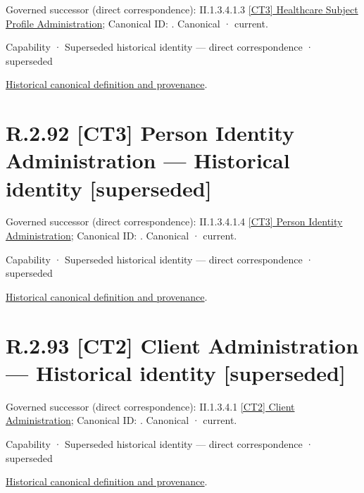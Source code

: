 {\small Governed successor (direct correspondence): II.1.3.4.1.3 \hyperref[element:df214b5499694b768eb4a7a175a9d471]{[CT3] Healthcare Subject Profile Administration}; Canonical ID: \texttt{}. Canonical · current.}\par
\label{element:d653c3247ddd49479f985f6b435933a0}
{\small Capability · Superseded historical identity — direct correspondence · superseded}\par
\href{../../../../../../../continuum/strategy/capability/d653c3247ddd49479f985f6b435933a0.md}{Historical canonical definition and provenance}.\par
\section*{R.2.92 [CT3] Person Identity Administration — Historical identity [superseded]}
\label{navigation:R.2.92}

{\small Governed successor (direct correspondence): II.1.3.4.1.4 \hyperref[element:6c3de7750ef1436cad6a9533731782b6]{[CT3] Person Identity Administration}; Canonical ID: \texttt{}. Canonical · current.}\par
\label{element:7550fd5b17e643118fa76d2616e1ba20}
{\small Capability · Superseded historical identity — direct correspondence · superseded}\par
\href{../../../../../../../continuum/strategy/capability/7550fd5b17e643118fa76d2616e1ba20.md}{Historical canonical definition and provenance}.\par
\section*{R.2.93 [CT2] Client Administration — Historical identity [superseded]}
\label{navigation:R.2.93}

{\small Governed successor (direct correspondence): II.1.3.4.1 \hyperref[element:f0885472cced4bccbcce1568bf0360dc]{[CT2] Client Administration}; Canonical ID: \texttt{}. Canonical · current.}\par
\label{element:70d2a44a0442441f8b306b82b297bb8a}
{\small Capability · Superseded historical identity — direct correspondence · superseded}\par
\href{../../../../../../../continuum/strategy/capability/70d2a44a0442441f8b306b82b297bb8a.md}{Historical canonical definition and provenance}.\par
